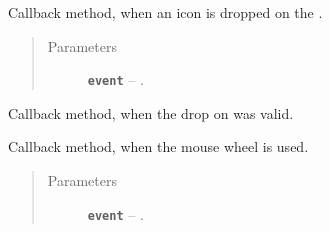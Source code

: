 \documentclass[a4paper,10pt,english]{sphinxmanual}
\begin{document}
\begin{fulllineitems}
\begin{fulllineitems}
\begin{quote}
\begin{description}
\end{description}\end{quote}

\end{fulllineitems}


\begin{fulllineitems}
\label{gui_link:gui.DiagramEditor.EditorGraphicsView.dropEvent}
Callback method, when an icon is dropped on the .
\begin{quote}\begin{description}
\item[{Parameters}] \leavevmode
\textbf{\texttt{event}} -- .

\end{description}\end{quote}

\end{fulllineitems}


\begin{fulllineitems}
\label{gui_link:gui.DiagramEditor.EditorGraphicsView.validDrop}
Callback method, when the drop on  was valid.

\end{fulllineitems}


\begin{fulllineitems}
\label{gui_link:gui.DiagramEditor.EditorGraphicsView.wheelEvent}
Callback method, when the mouse wheel is used.
\begin{quote}\begin{description}
\item[{Parameters}] \leavevmode
\textbf{\texttt{event}} -- .

\end{description}\end{quote}

\end{fulllineitems}


\end{fulllineitems}
\end{document}
